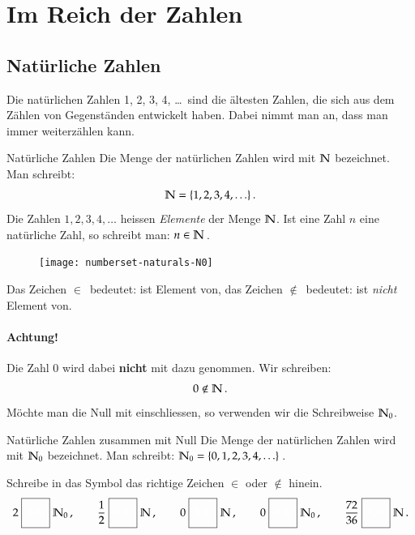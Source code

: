 \newpage

\section{Im Reich der Zahlen}
\subsection{Natürliche Zahlen}
Die natürlichen Zahlen 1, 2, 3, 4, \ldots ~sind die ältesten Zahlen, die sich aus dem Zählen von Gegenständen entwickelt haben.
Dabei nimmt man an, dass man immer weiterzählen kann.\\

\begin{defn}{Natürliche Zahlen}
	Die Menge der natürlichen Zahlen wird mit $\mathbb{N}$ bezeichnet.
	Man schreibt:
	\begin{align*} 
	 \mathbb{N} = \{ 1, 2, 3, 4, \ldots \}\, .
	\end{align*}
	Die Zahlen $1, 2, 3, 4, \ldots$ heissen \emph{Elemente} der Menge $\mathbb{N}$.
	Ist eine Zahl $n$ eine natürliche Zahl, so schreibt man: $n\in\mathbb{N}$\,.
\end{defn}

\vspace{.5cm}
\begin{figure}
	\texttt{[image: numberset-naturals-N0]}
\end{figure}
Das Zeichen \glqq $\in$\grqq~bedeutet: \glqq ist Element von\grqq, das Zeichen \glqq $\notin$\grqq~bedeutet: \glqq ist \emph{nicht} Element von\grqq.

\paragraph{Achtung!}
Die Zahl 0 wird dabei {\bfseries nicht} mit dazu genommen.
Wir schreiben:
\begin{align*}
  0 \notin \mathbb{N}\, .
\end{align*}
Möchte man die Null mit einschliessen, so verwenden wir die Schreibweise $\mathbb{N}_0$.\\

\begin{defn}{Natürliche Zahlen zusammen mit Null}
	Die Menge der natürlichen Zahlen wird mit $\mathbb{N}_0$ bezeichnet.
	Man schreibt: $\mathbb{N}_0 = \{ 0, 1, 2, 3, 4, \ldots \}$\,.
\end{defn}

\begin{example}
  Schreibe in das Symbol \relationBox das richtige Zeichen $\in$ oder $\notin$ hinein.
  \begin{align*}
   2 \relationBox \N_0\,,\qquad
   \frac{1}{2} \relationBox \N\,,\qquad
   0 \relationBox \N\,,\qquad
   0 \relationBox \N_0\,,\qquad
   \frac{72}{36} \relationBox \N\,.
  \end{align*}

\end{example}


